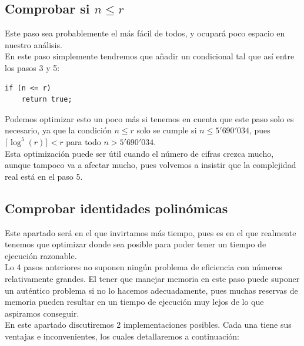 \subsection{Comprobar si $n \leq r$}

Este paso sea probablemente el más fácil de todos, y ocupará poco espacio en nuestro análisis.\\

En este paso simplemente tendremos que añadir un condicional tal que así entre los pasos 3 y 5:\\

\begin{lstlisting}
if (n <= r)
	return true;
\end{lstlisting}

Podemos optimizar esto un poco más si tenemos en cuenta que este paso solo es necesario, ya que la condición $n \leq r$ solo se cumple si $n \leq 5'690'034$, pues $\lceil \log^5(r) \rceil < r$ para todo $n > 5'690'034$.\\

Esta optimización puede ser útil cuando el número de cifras crezca mucho, aunque tampoco va a afectar mucho, pues volvemos a insistir que la complejidad real está en el paso 5.

\subsection{Comprobar identidades polinómicas}

Este apartado será en el que invirtamos más tiempo, pues es en el que realmente tenemos que optimizar donde sea posible para poder tener un tiempo de ejecución razonable.\\

Lo 4 pasos anteriores no suponen ningún problema de eficiencia con números relativamente grandes. El tener que manejar memoria en este paso puede suponer un auténtico problema si no lo hacemos adecuadamente, pues muchas reservas de memoria pueden resultar en un tiempo de ejecución muy lejos de lo que aspiramos conseguir.\\

En este apartado discutiremos 2 implementaciones posibles. Cada una tiene sus ventajas e inconvenientes, los cuales detallaremos a continuación:\\

